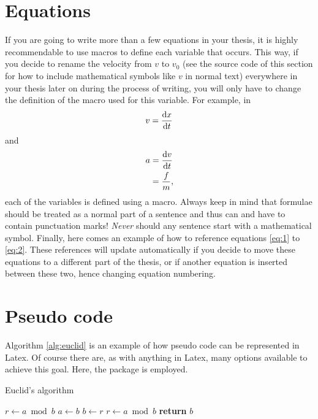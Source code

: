 \section{Equations}
\label{sec:equations}
If you are going to write more than a few equations in your thesis, it is highly recommendable to use macros to define each variable that occurs.
This way, if you decide to rename the velocity from $v$ to $v_0$ (see the source code of this section for how to include mathematical symbols like $v$ in normal text) everywhere in your thesis later on during the process of writing, you will only have to change the definition of the macro used for this variable.
For example, in
\begin{equation}
  \label{eq:1}
  v = \frac{\mathrm{d} x}{\mathrm{d} t}
\end{equation}
and
\begin{align}
  \label{eq:2}
  a &= \frac{\mathrm{d} v}{\mathrm{d} t} \nonumber \\
  &= \frac{f}{m},
\end{align}
each of the variables is defined using a macro.
Always keep in mind that formulae should be treated as a normal part of a sentence and thus can and have to contain punctuation marks!
\emph{Never} should any sentence start with a mathematical symbol.
Finally, here comes an example of how to reference equations \eqref{eq:1} to \eqref{eq:2}.
These references will update automatically if you decide to move these equations to a different part of the thesis, or if another equation is inserted between these two, hence changing equation numbering.

\section{Pseudo code}
Algorithm \ref{alg:euclid} is an example of how pseudo code can be represented in Latex.
Of course there are, as with anything in Latex, many options available to achieve this goal.
Here, the  package is employed.
\begin{algorithm}
    \caption{Euclid's algorithm}
    \label{alg:euclid}
    \begin{algorithmic}[1] %
         
            \State $r\gets a \bmod b$
             
                \State $a \gets b$
                \State $b \gets r$
                \State $r \gets a \bmod b$
            \EndWhile\label{euclidendwhile}
            \State \textbf{return} $b$
        \EndProcedure
    \end{algorithmic}
\end{algorithm}




